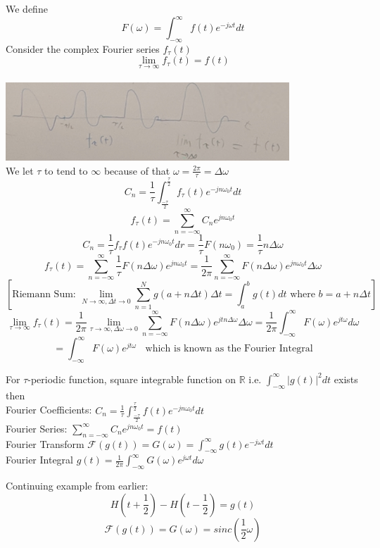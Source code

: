 \documentclass[11pt]{article}
\theoremstyle{definition}
\newcommand{\R}{\mathbb{R}}
\begin{document}
We define 
$$F(\omega) =  \int^{\infty}_{-\infty} f(t) e^{-j\omega t}dt $$
Consider the complex Fourier series $f_\tau (t)$ 
$$\lim_{\tau\to\infty} f_\tau(t) = f(t)$$\\
\includegraphics[width=0.8\textwidth]{periodic.jpg}\\

We let $\tau$ to tend to $\infty$ because of that $\omega = \frac{2\pi}{\tau} = \Delta \omega$
$$C_n = \frac{1}{\tau} \int^{\frac{\tau}{2}}_{\frac{-\tau}{2}}f_\tau (t) e^{-jn\omega_0 t}dt$$
$$f_\tau(t) = \sum_{n = -\infty}^\infty C_ne^{jn\omega_0t}$$
$$C_n = \frac{1}{\tau}f_{\tau}f(t)e^{-jn\omega_0 t}dr = \frac{1}{\tau}F(n\omega_0) = \frac{1}{\tau}n\Delta\omega$$
$$f_\tau(t) = \sum_{n = -\infty}^\infty \frac{1}{\tau}F(n\Delta\omega)e^{jn\omega_0t} = \frac{1}{2\pi}\sum_{n = -\infty}^\infty F(n\Delta\omega)e^{jn\omega_0t}\Delta\omega $$
$$[\text{Riemann Sum: }\lim_{N\to\infty, \Delta t \to 0} \sum_{n = 1}^N g(a+n\Delta t) \Delta t = \int_a^b g(t)dt \text{ where } b = a + n\Delta t]$$
$$\lim_{\tau \to \infty} f_\tau (t) = \frac{1}{2\pi}\lim_{\tau \to \infty, \Delta\omega \to 0}\sum_{n=-\infty}^\infty F(n\Delta\omega)e^{jtn\Delta \omega}\Delta \omega = \frac{1}{2\pi}\int^\infty_{-\infty}F(\omega)  e^{jt\omega}d\omega$$
$$ = \int_{-\infty}^{\infty}F(\omega)e^{jt\omega}\;\; \text{ which is known as the Fourier Integral}$$


\newpage
For $\tau$-periodic function, square integrable function on $\R$ i.e.  $\int_{-\infty}^{\infty}|g(t)|^2dt$ exists
then\\
Fourier Coefficients: $C_n = \frac{1}{\tau} \int^{\frac{\tau}{2}}_{\frac{-\tau}{2}}f(t)e^{-jn\omega_0 t}dt$\\
Fourier Series: $\sum_{n=-\infty}^\infty C_n e^{jn\omega_0 t} = f(t)$\\
Fourier Transform $\mathcal{F}(g(t)) = G(\omega) = \int_{-\infty}^{\infty}g(t)e^{-j\omega t}dt$\\
Fourier Integral $g(t) = \frac{1}{2\pi} \int_{-\infty}^{\infty}G(\omega)e^{j\omega t}d\omega$

Continuing example from earlier:
$$H(t+\frac{1}{2}) - H(t-\frac{1}{2}) = g(t)$$
$$\mathcal{F}(g(t)) = G(\omega) = sinc(\frac{1}{2}\omega)$$
\end{document}
